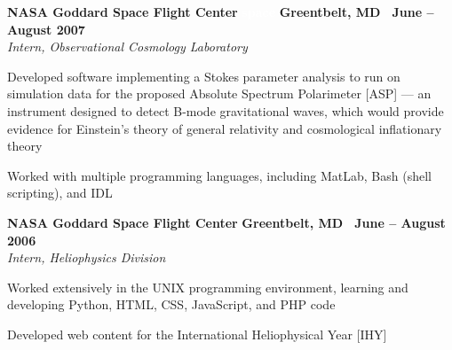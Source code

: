 \documentclass[10pt]{article}
\newcommand{\leftandright}[2]{\noindent\textbf{#1}\hfill
\textbf{#2}}
\begin{document}
\leftandright{NASA Goddard Space Flight Center }{ }
\leftandright{\textcolor{white}{space} }{Greentbelt, MD \textbullet\, June -- August 2007}\\  
\vspace{-0.8em}
\textit{Intern, Observational Cosmology Laboratory} 
\begin{itemize*}
  \item Developed software implementing a Stokes parameter analysis to
    run on simulation data for the proposed Absolute Spectrum
    Polarimeter [ASP] --- an instrument designed to detect B-mode
    gravitational waves, which would provide evidence for Einstein's
    theory of general relativity and cosmological inflationary theory
  \item Worked with multiple programming languages, including MatLab,
    Bash (shell scripting), and IDL 
\end{itemize*}


\leftandright{NASA Goddard Space Flight Center}{Greentbelt, MD \textbullet\, June -- August 2006}\\  
\vspace{-0.8em}
\textit{Intern,  Heliophysics Division}
\begin{itemize*}
  \item Worked extensively in the UNIX programming environment, learning and
    developing Python, HTML, CSS, JavaScript, and PHP code
  \item Developed web content for the International Heliophysical Year [IHY]
\end{itemize*}
\end{document}
